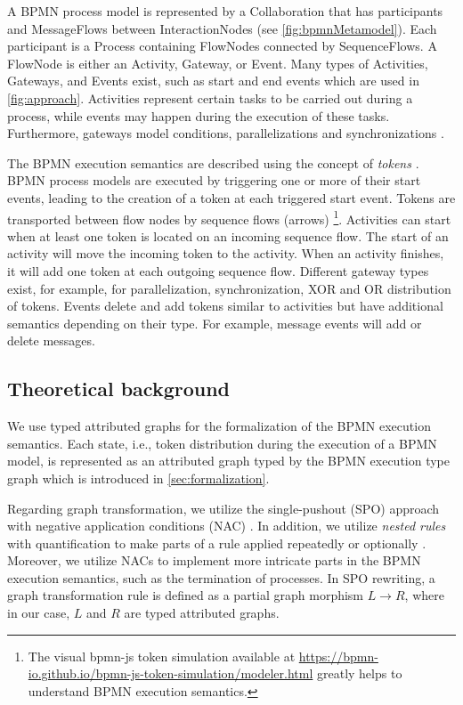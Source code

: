 \documentclass[submission, copyright, creativecommons]{eptcs}
\begin{document}
A BPMN process model is represented by a \textsf{Collaboration} that has \textsf{participants} and \textsf{MessageFlows} between \textsf{InteractionNodes} (see  \cref{fig:bpmnMetamodel}).
Each participant is a \textsf{Process} containing \textsf{FlowNodes} connected by \textsf{SequenceFlows}.
A \textsf{FlowNode} is either an \textsf{Activity}, \textsf{Gateway}, or \textsf{Event}.
Many types of \textsf{Activities}, \textsf{Gateways}, and \textsf{Events} exist, such as start and end events which are used in \cref{fig:approach}.
Activities represent certain tasks to be carried out during a process, while events may happen during the execution of these tasks.
Furthermore, gateways model conditions, parallelizations and synchronizations \cite{freundRealLifeBPMNUsing2019}.

The BPMN execution semantics are described using the concept of \emph{tokens} \cite{objectmanagementgroupBusinessProcessModel2013}.
BPMN process models are executed by triggering one or more of their start events, leading to the creation of a token at each triggered start event.
Tokens are transported between flow nodes by sequence flows (arrows)
\footnote{The visual bpmn-js token simulation available at \url{https://bpmn-io.github.io/bpmn-js-token-simulation/modeler.html} greatly helps to understand BPMN execution semantics.}.
Activities can start when at least one token is located on an incoming sequence flow.
The start of an activity will move the incoming token to the activity.
When an activity finishes, it will add one token at each outgoing sequence flow.
Different gateway types exist, for example, for parallelization, synchronization, XOR and OR distribution of tokens.
Events delete and add tokens similar to activities but have additional semantics depending on their type.
For example, message events will add or delete messages.

\subsection{Theoretical background}
We use typed attributed graphs for the formalization of the BPMN execution semantics.
Each state, i.e., token distribution during the execution of a BPMN model, is represented as an attributed graph typed by the BPMN execution type graph which is introduced in \cref{sec:formalization}.

Regarding graph transformation, we utilize the single-pushout (SPO) approach with negative application conditions (NAC) \cite{ehrigALGEBRAICAPPROACHESGRAPH1997}.
In addition, we utilize \emph{nested rules} with quantification to make parts of a rule applied repeatedly or optionally \cite{rensinkNestedQuantificationGraph2006,rensinkHowMuchAre2017}.
Moreover, we utilize NACs to implement more intricate parts in the BPMN execution semantics, such as the termination of processes. 
In SPO rewriting, a graph transformation rule is defined as a partial graph morphism $L \to R$, where in our case, $L$ and $R$ are typed attributed graphs. 
\end{document}

